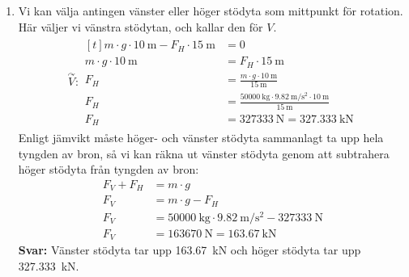 \documentclass[11pt]{article}
\begin{document}
\begin{enumerate}[itemsep=2em]
              \newpage
        \item
              Vi kan välja antingen vänster eller höger stödyta som mittpunkt för rotation. Här väljer vi vänstra stödytan, och kallar den för $V$.
              \begin{align*}
                      \overset{\curvearrowright}{V} : \begin{aligned}[t]
                                                              m \cdot g \cdot \SI{10}{\meter} - F_{H} \cdot \SI{15}{\meter} & = 0                                                                                                            \\
                                                              m \cdot g \cdot \SI{10}{\meter}                               & = F_{H} \cdot \SI{15}{\meter}                                                                                  \\
                                                              F_{H}                                                         & = \frac{m \cdot g \cdot \SI{10}{\meter}}{\SI{15}{\meter}}                                                      \\
                                                              F_{H}                                                         & = \frac{\SI{50 000}{\kilogram} \cdot \SI{9.82}{\meter/\second\squared} \cdot \SI{10}{\meter}}{\SI{15}{\meter}} \\
                                                              F_{H}                                                         & = \SI{327 333}{\newton} = \SI{327.333}{\kilo\newton}
                                                      \end{aligned}
              \end{align*}
              Enligt jämvikt måste höger- och vänster stödyta sammanlagt ta upp hela tyngden av bron, så vi kan räkna ut vänster stödyta genom att subtrahera höger stödyta från tyngden av bron:
              \begin{align*}
                      F_V + F_H & = m \cdot g                                                                              \\
                      F_V       & = m \cdot g - F_H                                                                        \\
                      F_V       & = \SI{50 000}{\kilogram} \cdot \SI{9.82}{\meter/\second\squared} - \SI{327 333}{\newton} \\
                      F_V       & = \SI{163 670}{\newton} = \SI{163.67}{\kilo\newton}
              \end{align*}
              \textbf{Svar:} Vänster stödyta tar upp \SI{163.67}{\kilo\newton} och höger stödyta tar upp \SI{327.333}{\kilo\newton}.


\end{enumerate}
\end{document}

